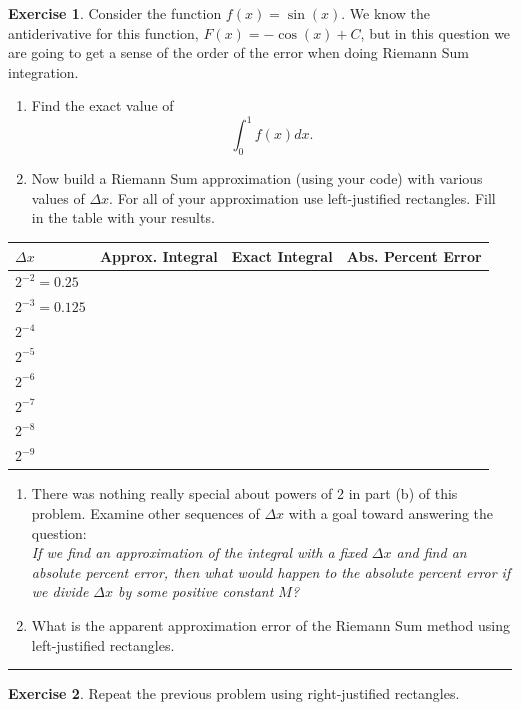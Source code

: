\documentclass[
]{book}
\theoremstyle{definition}
\theoremstyle{definition}
\theoremstyle{definition}
\newtheorem{exercise}{Exercise}[chapter]
\theoremstyle{remark}
\begin{document}
\begin{exercise}
\protect\hypertarget{exr:unnamed-chunk-173}{}{\label{exr:unnamed-chunk-173} }Consider the function \(f(x) = \sin(x)\). We know the antiderivative for this function, \(F(x) = -\cos(x) + C\), but in this question we are going to get a sense of the order of the error when doing Riemann Sum integration.

\begin{enumerate}
\def\labelenumi{\alph{enumi}.}
\item
  Find the exact value of \[\int_0^{1} f(x) dx.\]
\item
  Now build a Riemann Sum approximation (using your code) with various
  values of \(\Delta x\). For all of your approximation use
  left-justified rectangles. Fill in the table with your results.
\end{enumerate}

\begin{longtable}[]{@{}llll@{}}
\toprule
\(\Delta x\) & Approx. Integral & Exact Integral & Abs. Percent Error\tabularnewline
\midrule
\endhead
\(2^{-2} = 0.25\) & & &\tabularnewline
\(2^{-3} = 0.125\) & & &\tabularnewline
\(2^{-4}\) & & &\tabularnewline
\(2^{-5}\) & & &\tabularnewline
\(2^{-6}\) & & &\tabularnewline
\(2^{-7}\) & & &\tabularnewline
\(2^{-8}\) & & &\tabularnewline
\(2^{-9}\) & & &\tabularnewline
\bottomrule
\end{longtable}

\begin{enumerate}
\def\labelenumi{\alph{enumi}.}
\setcounter{enumi}{2}
\item
  There was nothing really special about powers of 2 in part (b) of
  this problem. Examine other sequences of \(\Delta x\) with a goal
  toward answering the question:\\
  \emph{If we find an approximation of the integral with a fixed \(\Delta x\) and find an absolute percent error, then what would happen to the absolute percent error if we divide \(\Delta x\) by some positive constant \(M\)?}
\item
  What is the apparent approximation error of the Riemann Sum method
  using left-justified rectangles.
\end{enumerate}
\end{exercise}

\begin{center}\rule{0.5\linewidth}{0.5pt}\end{center}

\begin{exercise}
\protect\hypertarget{exr:unnamed-chunk-174}{}{\label{exr:unnamed-chunk-174} }Repeat the previous problem using right-justified rectangles.
\end{exercise}
\end{document}
